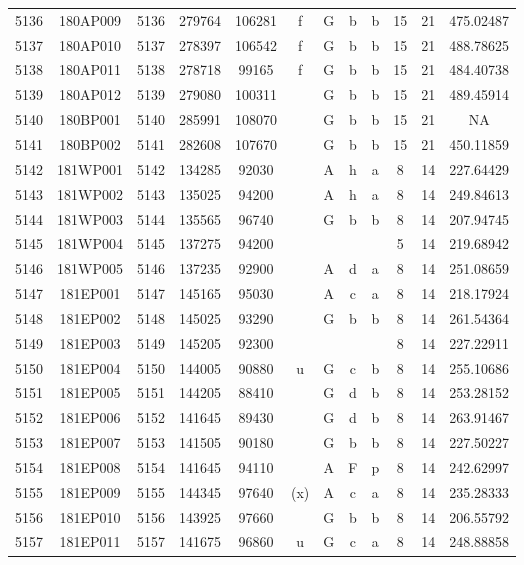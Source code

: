 \begin{tabular}{|*{12}{c|}}
5136 & 180AP009 & 5136 & 279764 & 106281 & f & G & b & b & 15 & 21 & 475.02487 \\ 
5137 & 180AP010 & 5137 & 278397 & 106542 & f & G & b & b & 15 & 21 & 488.78625 \\ 
5138 & 180AP011 & 5138 & 278718 & 99165 & f & G & b & b & 15 & 21 & 484.40738 \\ 
5139 & 180AP012 & 5139 & 279080 & 100311 &  & G & b & b & 15 & 21 & 489.45914 \\ 
5140 & 180BP001 & 5140 & 285991 & 108070 &  & G & b & b & 15 & 21 & NA \\ 
5141 & 180BP002 & 5141 & 282608 & 107670 &  & G & b & b & 15 & 21 & 450.11859 \\ 
5142 & 181WP001 & 5142 & 134285 & 92030 &  & A & h & a & 8 & 14 & 227.64429 \\ 
5143 & 181WP002 & 5143 & 135025 & 94200 &  & A & h & a & 8 & 14 & 249.84613 \\ 
5144 & 181WP003 & 5144 & 135565 & 96740 &  & G & b & b & 8 & 14 & 207.94745 \\ 
5145 & 181WP004 & 5145 & 137275 & 94200 &  &  &  &  & 5 & 14 & 219.68942 \\ 
5146 & 181WP005 & 5146 & 137235 & 92900 &  & A & d & a & 8 & 14 & 251.08659 \\ 
5147 & 181EP001 & 5147 & 145165 & 95030 &  & A & c & a & 8 & 14 & 218.17924 \\ 
5148 & 181EP002 & 5148 & 145025 & 93290 &  & G & b & b & 8 & 14 & 261.54364 \\ 
5149 & 181EP003 & 5149 & 145205 & 92300 &  &  &  &  & 8 & 14 & 227.22911 \\ 
5150 & 181EP004 & 5150 & 144005 & 90880 & u & G & c & b & 8 & 14 & 255.10686 \\ 
5151 & 181EP005 & 5151 & 144205 & 88410 &  & G & d & b & 8 & 14 & 253.28152 \\ 
5152 & 181EP006 & 5152 & 141645 & 89430 &  & G & d & b & 8 & 14 & 263.91467 \\ 
5153 & 181EP007 & 5153 & 141505 & 90180 &  & G & b & b & 8 & 14 & 227.50227 \\ 
5154 & 181EP008 & 5154 & 141645 & 94110 &  & A & F & p & 8 & 14 & 242.62997 \\ 
5155 & 181EP009 & 5155 & 144345 & 97640 & (x) & A & c & a & 8 & 14 & 235.28333 \\ 
5156 & 181EP010 & 5156 & 143925 & 97660 &  & G & b & b & 8 & 14 & 206.55792 \\ 
5157 & 181EP011 & 5157 & 141675 & 96860 & u & G & c & a & 8 & 14 & 248.88858 \\ 

\end{tabular}
